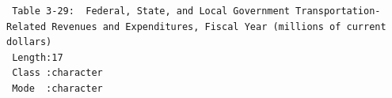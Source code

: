 \documentclass[
  letterpaper,
  DIV=11,
  numbers=noendperiod]{scrreprt}
\begin{document}
\begin{verbatim}
 Table 3-29:  Federal, State, and Local Government Transportation-Related Revenues and Expenditures, Fiscal Year (millions of current dollars)
 Length:17                                                                                                                                    
 Class :character                                                                                                                             
 Mode  :character                                                                                                                             
                                                                                                                                              
                                                                                                                                              
                                                                                                                                              

\end{verbatim}
\end{document}

